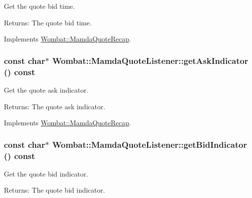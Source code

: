 Get the quote bid time. 

\begin{Desc}
\item[Returns:]The quote bid time. \end{Desc}


Implements \hyperlink{classWombat_1_1MamdaQuoteRecap_42016fe76b884a22fb769c3eceac39ad}{Wombat::Mamda\-Quote\-Recap}.\hypertarget{classWombat_1_1MamdaQuoteListener_fac643c6fb9ad15e2d443d6a03304dfe}{
\subsubsection[getAskIndicator]{\setlength{\rightskip}{0pt plus 5cm}const char$\ast$ Wombat::Mamda\-Quote\-Listener::get\-Ask\-Indicator () const}}
\label{classWombat_1_1MamdaQuoteListener_fac643c6fb9ad15e2d443d6a03304dfe}


Get the quote ask indicator. 

\begin{Desc}
\item[Returns:]The quote ask indicator. \end{Desc}


Implements \hyperlink{classWombat_1_1MamdaQuoteRecap_f2cd889d5838aa3204784eb57e447d4e}{Wombat::Mamda\-Quote\-Recap}.\hypertarget{classWombat_1_1MamdaQuoteListener_2ac1e2dabc677e93e414cf0c1d1fa94f}{
\subsubsection[getBidIndicator]{\setlength{\rightskip}{0pt plus 5cm}const char$\ast$ Wombat::Mamda\-Quote\-Listener::get\-Bid\-Indicator () const}}
\label{classWombat_1_1MamdaQuoteListener_2ac1e2dabc677e93e414cf0c1d1fa94f}


Get the quote bid indicator. 

\begin{Desc}
\item[Returns:]The quote bid indicator. \end{Desc}


